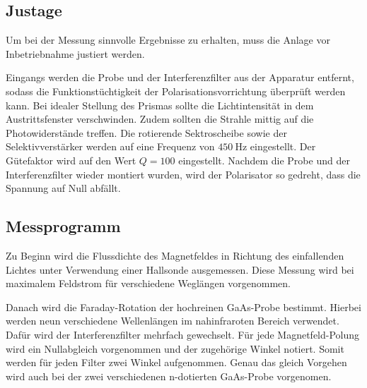 \subsection{Justage}
Um bei der Messung sinnvolle Ergebnisse zu erhalten, muss die Anlage vor Inbetriebnahme justiert werden. 

\noindent
Eingangs werden die Probe und der Interferenzfilter aus der Apparatur entfernt, sodass die Funktionstüchtigkeit der
Polarisationsvorrichtung überprüft werden kann. Bei idealer Stellung des Prismas sollte die Lichtintensität in dem 
Austrittsfenster verschwinden. Zudem sollten die Strahle mittig auf die Photowiderstände treffen. 
Die rotierende Sektroscheibe sowie der Selektivverstärker werden auf eine Frequenz von $\SI{450}{\hertz}$ eingestellt. 
Der Gütefaktor wird auf den Wert $Q=\num{100}$ eingestellt. 
Nachdem die Probe und der Interferenzfilter wieder montiert wurden, wird der Polarisator so gedreht, dass die Spannung auf Null
abfällt. 

\subsection{Messprogramm}
Zu Beginn wird die Flussdichte des Magnetfeldes in Richtung des einfallenden Lichtes unter Verwendung einer Hallsonde ausgemessen.
Diese Messung wird bei maximalem Feldstrom für verschiedene Weglängen vorgenommen.

\noindent
Danach wird die Faraday-Rotation der hochreinen GaAs-Probe bestimmt. Hierbei werden neun verschiedene Wellenlängen im nahinfraroten
Bereich verwendet. Dafür wird der Interferenzfilter mehrfach gewechselt. Für jede Magnetfeld-Polung wird ein Nullabgleich vorgenommen 
und der zugehörige Winkel notiert. Somit werden für jeden Filter zwei Winkel aufgenommen. Genau das gleich Vorgehen wird auch bei der 
zwei verschiedenen n-dotierten GaAs-Probe vorgenomen. 